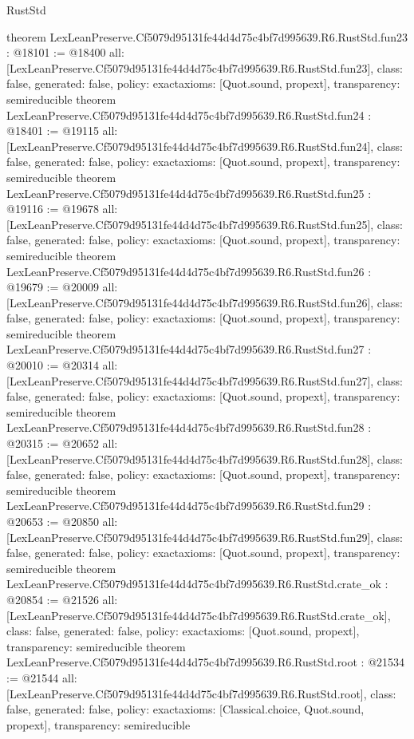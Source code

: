 \begin{lexlean}{RustStd}
\begin{coremodule}
{}
theorem LexLeanPreserve.Cf5079d95131fe44d4d75c4bf7d995639.R6.RustStd.fun23 : @18101 := @18400 {
  all: [LexLeanPreserve.Cf5079d95131fe44d4d75c4bf7d995639.R6.RustStd.fun23],
  class: false,
  generated: false,
  policy: exact{axioms: [Quot.sound, propext]},
  transparency: semireducible
}
theorem LexLeanPreserve.Cf5079d95131fe44d4d75c4bf7d995639.R6.RustStd.fun24 : @18401 := @19115 {
  all: [LexLeanPreserve.Cf5079d95131fe44d4d75c4bf7d995639.R6.RustStd.fun24],
  class: false,
  generated: false,
  policy: exact{axioms: [Quot.sound, propext]},
  transparency: semireducible
}
theorem LexLeanPreserve.Cf5079d95131fe44d4d75c4bf7d995639.R6.RustStd.fun25 : @19116 := @19678 {
  all: [LexLeanPreserve.Cf5079d95131fe44d4d75c4bf7d995639.R6.RustStd.fun25],
  class: false,
  generated: false,
  policy: exact{axioms: [Quot.sound, propext]},
  transparency: semireducible
}
theorem LexLeanPreserve.Cf5079d95131fe44d4d75c4bf7d995639.R6.RustStd.fun26 : @19679 := @20009 {
  all: [LexLeanPreserve.Cf5079d95131fe44d4d75c4bf7d995639.R6.RustStd.fun26],
  class: false,
  generated: false,
  policy: exact{axioms: [Quot.sound, propext]},
  transparency: semireducible
}
theorem LexLeanPreserve.Cf5079d95131fe44d4d75c4bf7d995639.R6.RustStd.fun27 : @20010 := @20314 {
  all: [LexLeanPreserve.Cf5079d95131fe44d4d75c4bf7d995639.R6.RustStd.fun27],
  class: false,
  generated: false,
  policy: exact{axioms: [Quot.sound, propext]},
  transparency: semireducible
}
theorem LexLeanPreserve.Cf5079d95131fe44d4d75c4bf7d995639.R6.RustStd.fun28 : @20315 := @20652 {
  all: [LexLeanPreserve.Cf5079d95131fe44d4d75c4bf7d995639.R6.RustStd.fun28],
  class: false,
  generated: false,
  policy: exact{axioms: [Quot.sound, propext]},
  transparency: semireducible
}
theorem LexLeanPreserve.Cf5079d95131fe44d4d75c4bf7d995639.R6.RustStd.fun29 : @20653 := @20850 {
  all: [LexLeanPreserve.Cf5079d95131fe44d4d75c4bf7d995639.R6.RustStd.fun29],
  class: false,
  generated: false,
  policy: exact{axioms: [Quot.sound, propext]},
  transparency: semireducible
}
theorem LexLeanPreserve.Cf5079d95131fe44d4d75c4bf7d995639.R6.RustStd.crate_ok : @20854 := @21526 {
  all: [LexLeanPreserve.Cf5079d95131fe44d4d75c4bf7d995639.R6.RustStd.crate_ok],
  class: false,
  generated: false,
  policy: exact{axioms: [Quot.sound, propext]},
  transparency: semireducible
}
theorem LexLeanPreserve.Cf5079d95131fe44d4d75c4bf7d995639.R6.RustStd.root : @21534 := @21544 {
  all: [LexLeanPreserve.Cf5079d95131fe44d4d75c4bf7d995639.R6.RustStd.root],
  class: false,
  generated: false,
  policy: exact{axioms: [Classical.choice, Quot.sound, propext]},
  transparency: semireducible
}


\end{coremodule}
\end{lexlean}
